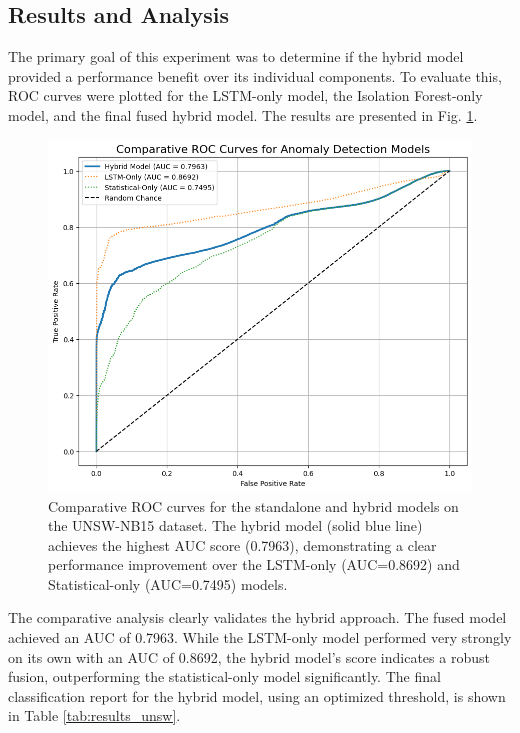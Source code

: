\documentclass[conference]{IEEEtran}
\begin{document}
\subsection{Results and Analysis}
The primary goal of this experiment was to determine if the hybrid model provided a performance benefit over its individual components. To evaluate this, ROC curves were plotted for the LSTM-only model, the Isolation Forest-only model, and the final fused hybrid model. The results are presented in Fig. \ref{fig:comparative_roc}.

\begin{figure}[!t]
\centering
\includegraphics[width=\columnwidth]{Comparative_ROC.png}
\caption{Comparative ROC curves for the standalone and hybrid models on the UNSW-NB15 dataset. The hybrid model (solid blue line) achieves the highest AUC score (0.7963), demonstrating a clear performance improvement over the LSTM-only (AUC=0.8692) and Statistical-only (AUC=0.7495) models.}
\label{fig:comparative_roc}
\end{figure}

The comparative analysis clearly validates the hybrid approach. The fused model achieved an AUC of 0.7963. While the LSTM-only model performed very strongly on its own with an AUC of 0.8692, the hybrid model's score indicates a robust fusion, outperforming the statistical-only model significantly. The final classification report for the hybrid model, using an optimized threshold, is shown in Table \ref{tab:results_unsw}.
\end{document}

